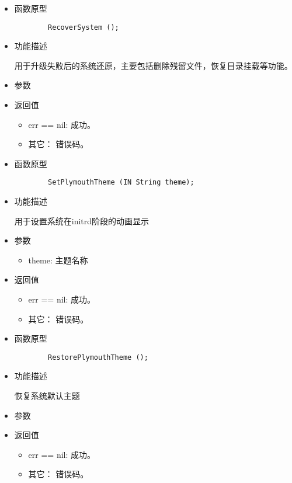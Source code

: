 \documentclass{utart}
\begin{document}
\begin{itemize}
    \item 函数原型
    
    \begin{verbatim}
        RecoverSystem ();
      \end{verbatim}
    \item 功能描述
    
    用于升级失败后的系统还原，主要包括删除残留文件，恢复目录挂载等功能。
    \item 参数
      \begin{itemize}
      \end{itemize}
    \item 返回值
      \begin{itemize}
          \item err == nil: 成功。
          \item 其它： 错误码。
      \end{itemize}
\end{itemize}

\begin{itemize}
    \item 函数原型
    
    \begin{verbatim}
        SetPlymouthTheme (IN String theme);
      \end{verbatim}
    \item 功能描述
    
    用于设置系统在initrd阶段的动画显示
    \item 参数
      \begin{itemize}
        \item theme: 主题名称
      \end{itemize}
    \item 返回值
      \begin{itemize}
          \item err == nil: 成功。
          \item 其它： 错误码。
      \end{itemize}
\end{itemize}


\begin{itemize}
    \item 函数原型
    
    \begin{verbatim}
        RestorePlymouthTheme ();
      \end{verbatim}
    \item 功能描述
    
    恢复系统默认主题
    \item 参数
      \begin{itemize}
      \end{itemize}
    \item 返回值
      \begin{itemize}
          \item err == nil: 成功。
          \item 其它： 错误码。
      \end{itemize}
\end{itemize}
\end{document}
